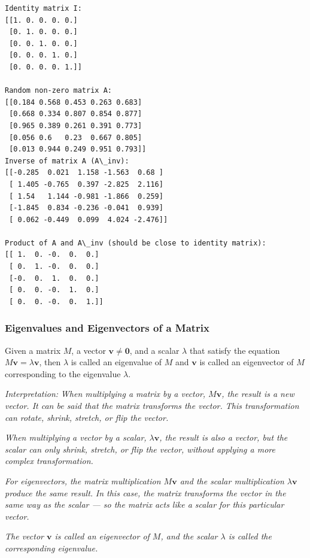 \documentclass[11pt]{article}
\begin{document}
    \begin{Verbatim}[commandchars=\\\{\}]
Identity matrix I:
[[1. 0. 0. 0. 0.]
 [0. 1. 0. 0. 0.]
 [0. 0. 1. 0. 0.]
 [0. 0. 0. 1. 0.]
 [0. 0. 0. 0. 1.]]

Random non-zero matrix A:
[[0.184 0.568 0.453 0.263 0.683]
 [0.668 0.334 0.807 0.854 0.877]
 [0.965 0.389 0.261 0.391 0.773]
 [0.056 0.6   0.23  0.667 0.805]
 [0.013 0.944 0.249 0.951 0.793]]
Inverse of matrix A (A\_inv):
[[-0.285  0.021  1.158 -1.563  0.68 ]
 [ 1.405 -0.765  0.397 -2.825  2.116]
 [ 1.54   1.144 -0.981 -1.866  0.259]
 [-1.845  0.834 -0.236 -0.041  0.939]
 [ 0.062 -0.449  0.099  4.024 -2.476]]

Product of A and A\_inv (should be close to identity matrix):
[[ 1.  0. -0.  0.  0.]
 [ 0.  1. -0.  0.  0.]
 [-0.  0.  1.  0.  0.]
 [ 0.  0. -0.  1.  0.]
 [ 0.  0. -0.  0.  1.]]

    \end{Verbatim}

    \newpage

\subsubsection{Eigenvalues and Eigenvectors of a
Matrix}\label{eigenvalues-and-eigenvectors-of-a-matrix}

Given a matrix \(M\), a vector \(\pmb{v} \ne \mathbf{0}\), and a scalar
\(\lambda\) that satisfy the equation \(M \pmb{v} = \lambda \pmb{v}\),
then \(\lambda\) is called an eigenvalue of \(M\) and \(\pmb{v}\) is
called an eigenvector of \(M\) corresponding to the eigenvalue
\(\lambda\).

\emph{Interpretation:} \emph{When multiplying a matrix by a vector,
\(M \pmb{v}\), the result is a new vector. It can be said that the
matrix transforms the vector. This transformation can rotate, shrink,
stretch, or flip the vector.}

\emph{When multiplying a vector by a scalar, \(\lambda \pmb{v}\), the
result is also a vector, but the scalar can only shrink, stretch, or
flip the vector, without applying a more complex transformation.}

\emph{For eigenvectors, the matrix multiplication \(M \pmb{v}\) and the
scalar multiplication \(\lambda \pmb{v}\) produce the same result.}
\emph{In this case, the matrix transforms the vector in the same way as
the scalar --- so the matrix acts like a scalar for this particular
vector.}

\emph{The vector \(\pmb{v}\) is called an eigenvector of \(M\), and the
scalar \(\lambda\) is called the corresponding eigenvalue.}
\end{document}
